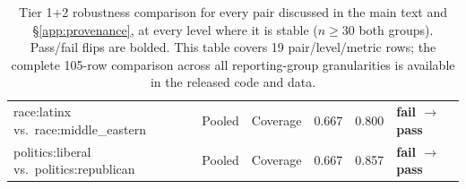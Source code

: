 \begin{table}[ht]
\begin{tabular}{@{} l c l r r l @{}}
race:latinx vs.\ race:middle\mbox{\_}eastern & Pooled & Coverage & 0.667 & 0.800 & \textbf{fail $\to$ pass} \\
politics:liberal vs.\ politics:republican & Pooled & Coverage & 0.667 & 0.857 & \textbf{fail $\to$ pass} \\
\bottomrule
\end{tabular}
\caption{Tier 1+2 robustness comparison for every pair discussed in the main text and \S\ref{app:provenance}, at every level where it is stable ($n \geq 30$ both groups). Pass/fail flips are bolded. This table covers 19 pair/level/metric rows; the complete 105-row comparison across all reporting-group granularities is available in the released code and data.}
\label{tab:robustness}
\end{table}
